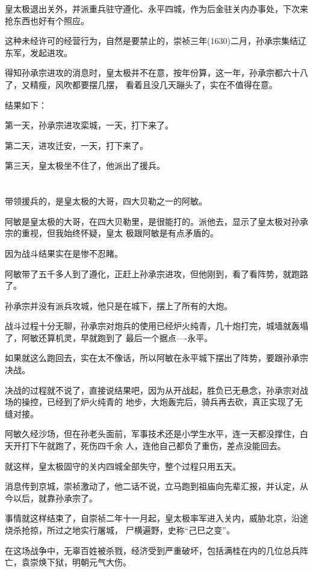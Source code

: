 \documentclass[11pt,a4paper,onecolumn]{article}
\begin{document}
皇太极退出关外，并派重兵驻守遵化、永平四城，作为后金驻关内办事处，下次来抢东西也好有个照应。

这种未经许可的经营行为，自然是要禁止的，崇祯三年(1630)二月，孙承宗集结辽东军，发起进攻。

得知孙承宗进攻的消息时，皇太极并不在意，按年份算，这一年，孙承宗都六十八了，又精瘦，风吹都要摆几摆，
看着且没几天蹦头了，实在不值得在意。

结果如下：

第一天，孙承宗进攻栾城，一天，打下来了。

第二天，进攻迁安，一天，打下来了。

第三天，皇太极坐不住了，他派出了援兵。

\section[\thesection]{}

带领援兵的，是皇太极的大哥，四大贝勒之一的阿敏。

阿敏是皇太极的大哥，在四大贝勒里，是很能打的。派他去，显示了皇太极对孙承宗的重视，但我始终怀疑，皇太
极跟阿敏是有点矛盾的。

因为战斗结果实在是惨不忍睹。

阿敏带了五千多人到了遵化，正赶上孙承宗进攻，但他刚到，看了看阵势，就跑路了。

孙承宗并没有派兵攻城，他只是在城下，摆上了所有的大炮。

战斗过程十分无聊，孙承宗对炮兵的使用已经炉火纯青，几十炮打完，城墙就轰塌了，阿敏还算机灵，早就跑到了
最后一个据点----永平。

如果就这么跑回去，实在太不像话，所以阿敏在永平城下摆出了阵势，要跟孙承宗决战。

决战的过程就不说了，直接说结果吧，因为从开战起，胜负已无悬念，孙承宗对战场的操控，已经到了炉火纯青的
地步，大炮轰完后，骑兵再去砍，真正实现了无缝对接。

阿敏久经沙场，但在孙老头面前，军事技术还是小学生水平，连一天都没撑住，白天开打下午就跑了，死伤四千余
人，连他自己都负了重伤，差点没能回去。

就这样，皇太极固守的关内四城全部失守，整个过程只用五天。

消息传到京城，崇祯激动了，他二话不说，立马跑到祖庙向先辈汇报，并认定，从今以后，就靠孙承宗了。

事情就这样结束了，自崇祯二年十一月起，皇太极率军进入关内，威胁北京，沿途烧杀抢掠，所过之地实行屠城，
尸横遍野，史称``己巳之变''。

在这场战争中，无辜百姓被杀戮，经济受到严重破坏，包括满桂在内的几位总兵阵亡，袁崇焕下狱，明朝元气大伤。
\end{document}
